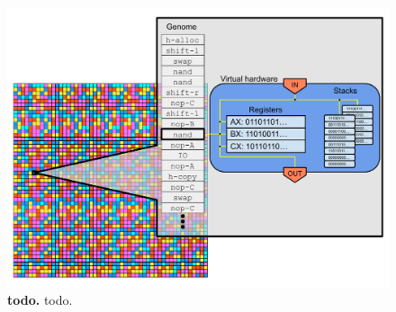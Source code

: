 \begin{figure}[h!]
    \centering
    \includegraphics[width=\textwidth]{media/avida-hardware.pdf}
    \caption{\small
    \textbf{todo.}
    todo.
    }
    \label{fig:avida-virtual-hardware}
\end{figure}